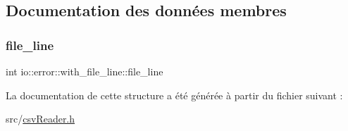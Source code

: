 \subsection{Documentation des données membres}
\mbox{\label{structio_1_1error_1_1with__file__line_a391298c37172bcdb83aeb3daf65d5a0e}} 
\subsubsection{\texorpdfstring{file\+\_\+line}{file\_line}}
{\footnotesize\ttfamily int io\+::error\+::with\+\_\+file\+\_\+line\+::file\+\_\+line}



La documentation de cette structure a été générée à partir du fichier suivant \+:\begin{DoxyCompactItemize}
\item 
src/\hyperlink{csvReader_8h}{csv\+Reader.\+h}\end{DoxyCompactItemize}
